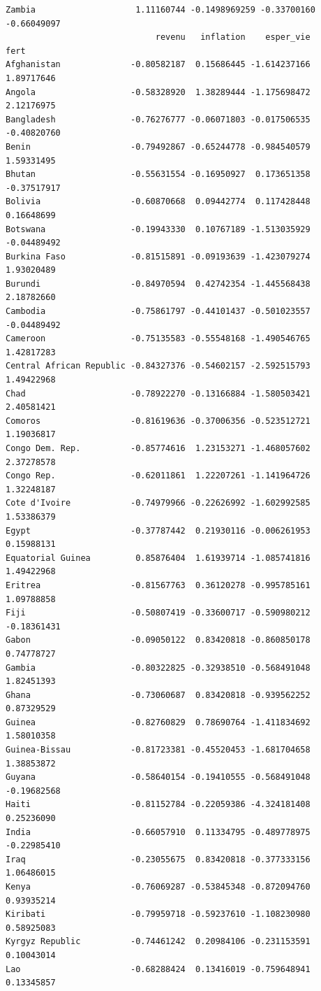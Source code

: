 \documentclass[
]{article}
\begin{document}
\begin{verbatim}
Zambia                    1.11160744 -0.1498969259 -0.33700160 -0.66049097
                              revenu   inflation    esper_vie        fert
Afghanistan              -0.80582187  0.15686445 -1.614237166  1.89717646
Angola                   -0.58328920  1.38289444 -1.175698472  2.12176975
Bangladesh               -0.76276777 -0.06071803 -0.017506535 -0.40820760
Benin                    -0.79492867 -0.65244778 -0.984540579  1.59331495
Bhutan                   -0.55631554 -0.16950927  0.173651358 -0.37517917
Bolivia                  -0.60870668  0.09442774  0.117428448  0.16648699
Botswana                 -0.19943330  0.10767189 -1.513035929 -0.04489492
Burkina Faso             -0.81515891 -0.09193639 -1.423079274  1.93020489
Burundi                  -0.84970594  0.42742354 -1.445568438  2.18782660
Cambodia                 -0.75861797 -0.44101437 -0.501023557 -0.04489492
Cameroon                 -0.75135583 -0.55548168 -1.490546765  1.42817283
Central African Republic -0.84327376 -0.54602157 -2.592515793  1.49422968
Chad                     -0.78922270 -0.13166884 -1.580503421  2.40581421
Comoros                  -0.81619636 -0.37006356 -0.523512721  1.19036817
Congo Dem. Rep.          -0.85774616  1.23153271 -1.468057602  2.37278578
Congo Rep.               -0.62011861  1.22207261 -1.141964726  1.32248187
Cote d'Ivoire            -0.74979966 -0.22626992 -1.602992585  1.53386379
Egypt                    -0.37787442  0.21930116 -0.006261953  0.15988131
Equatorial Guinea         0.85876404  1.61939714 -1.085741816  1.49422968
Eritrea                  -0.81567763  0.36120278 -0.995785161  1.09788858
Fiji                     -0.50807419 -0.33600717 -0.590980212 -0.18361431
Gabon                    -0.09050122  0.83420818 -0.860850178  0.74778727
Gambia                   -0.80322825 -0.32938510 -0.568491048  1.82451393
Ghana                    -0.73060687  0.83420818 -0.939562252  0.87329529
Guinea                   -0.82760829  0.78690764 -1.411834692  1.58010358
Guinea-Bissau            -0.81723381 -0.45520453 -1.681704658  1.38853872
Guyana                   -0.58640154 -0.19410555 -0.568491048 -0.19682568
Haiti                    -0.81152784 -0.22059386 -4.324181408  0.25236090
India                    -0.66057910  0.11334795 -0.489778975 -0.22985410
Iraq                     -0.23055675  0.83420818 -0.377333156  1.06486015
Kenya                    -0.76069287 -0.53845348 -0.872094760  0.93935214
Kiribati                 -0.79959718 -0.59237610 -1.108230980  0.58925083
Kyrgyz Republic          -0.74461242  0.20984106 -0.231153591  0.10043014
Lao                      -0.68288424  0.13416019 -0.759648941  0.13345857

\end{verbatim}
\end{document}
